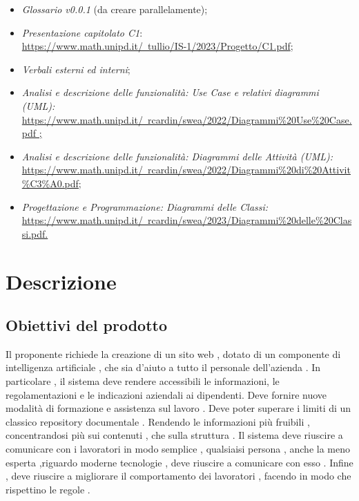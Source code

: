 \documentclass[10pt, a4paper]{article}
\begin{document}
    \begin{itemize}
    \item \textit{Glossario v0.0.1} (da creare parallelamente); 
    \item \textit{Presentazione capitolato C1}:\\
    \href{https://www.math.unipd.it/~tullio/IS-1/2023/Progetto/C1.pdf}{https://www.math.unipd.it/~tullio/IS-1/2023/Progetto/C1.pdf};
    \item \textit{Verbali esterni ed interni};
    \item \textit{Analisi e descrizione delle funzionalità: Use Case e relativi diagrammi (UML):}\\
    \href{https://www.math.unipd.it/~rcardin/swea/2022/Diagrammi%20Use%20Case.pdf}{https://www.math.unipd.it/~rcardin/swea/2022/Diagrammi\%20Use\%20Case.pdf ;}
    \item \textit{Analisi e descrizione delle funzionalità: Diagrammi delle Attività (UML):}\\
    \href{https://www.math.unipd.it/~rcardin/swea/2022/Diagrammi%20di%20Attivit%C3%A0.pdf}{https://www.math.unipd.it/~rcardin/swea/2022/Diagrammi\%20di\%20Attivit\%C3\%A0.pdf;}
    

    \item \textit{Progettazione e Programmazione: Diagrammi delle Classi:}\\
    \href{https://www.math.unipd.it/~rcardin/swea/2023/Diagrammi%20delle%20Classi.pdf}{https://www.math.unipd.it/~rcardin/swea/2023/Diagrammi\%20delle\%20Classi.pdf.}
    \end{itemize}

\newpage
\section{Descrizione}
\subsection{Obiettivi del prodotto}
Il proponente richiede la creazione di un sito web , dotato di un componente di intelligenza artificiale , che sia d'aiuto a tutto il personale dell'azienda .
In particolare , il sistema deve rendere accessibili le informazioni, le regolamentazioni e le indicazioni aziendali ai dipendenti.
Deve fornire nuove modalità di formazione e assistenza sul lavoro .
Deve poter superare i limiti di un classico repository documentale . Rendendo le informazioni più fruibili , concentrandosi più sui contenuti , che sulla struttura .
Il sistema deve riuscire a comunicare con i lavoratori in modo semplice , qualsiaisi persona , anche la meno esperta ,riguardo moderne tecnologie , deve riuscire a comunicare con esso .
Infine , deve riuscire a migliorare il comportamento dei lavoratori , facendo in modo che rispettino le regole .
\end{document}
